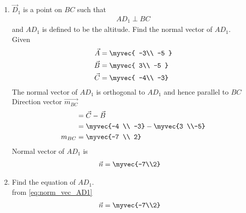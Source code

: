 \documentclass[11pt]{book}
\begin{document}
\begin{enumerate}[label=\thesection.\arabic*.,ref=\thesection.\theenumi]

\item $\vec{D}_1$ is a point on $BC$ such that
\begin{align}
AD_1 \perp BC
\end{align}
and $AD_1$ is defined to be the altitude. Find the normal vector of $AD_1$.
  \\   \solution Given  \\
  \begin{align} 
 \vec{A} &= \myvec{ -3\\ -5 } \\ \vec{B} &= \myvec{ 3\\ -5 }
  \\\vec{C} &= \myvec{ -4\\ -3}
 \end{align}
The normal vector of $AD_{1}$ is orthogonal to $AD_1$ and hence parallel to $BC$ \\ Direction vector $\vec{m_{BC}}$ 
\begin{align}
    &=\vec{C}-\vec{B}\\
    &=\myvec{-4 \\ -3} -\myvec{3 \\-5} \\
    m_{BC} &= \myvec{-7 \\ 2}
\end{align}
Normal vector of $AD_1$ is
\begin{align}
\label{eq:norm_vec_AD1}
	\vec{n} &= 
\myvec{-7\\2}
\end{align}

\item Find the equation of $AD_1$.
 \\    \solution from \eqref{eq:norm_vec_AD1} 
 \begin{align}
	\vec{n} &= 
\myvec{-7\\2}
\end{align}


\end{enumerate}
\end{document}
